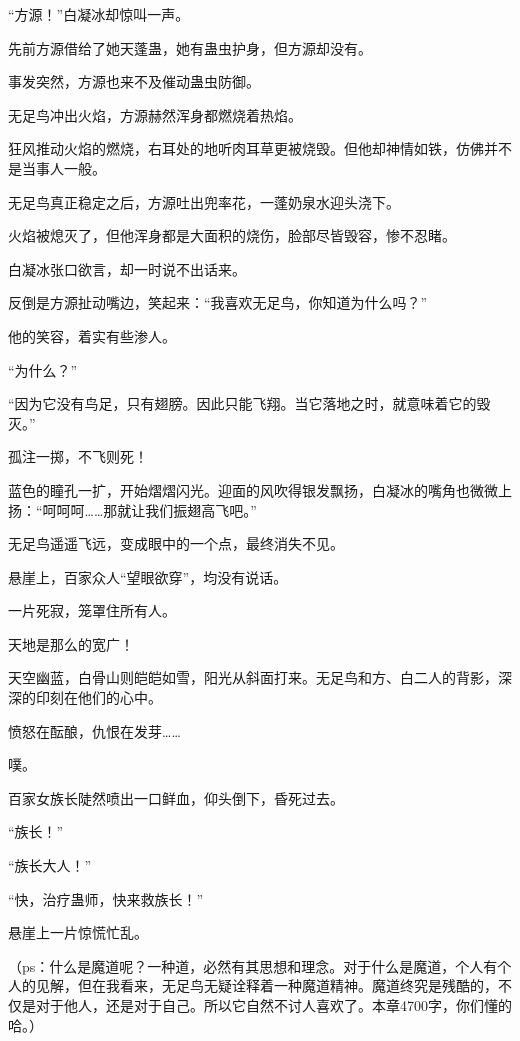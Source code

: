 \begin{this_body}
“方源！”白凝冰却惊叫一声。

先前方源借给了她天蓬蛊，她有蛊虫护身，但方源却没有。

事发突然，方源也来不及催动蛊虫防御。

无足鸟冲出火焰，方源赫然浑身都燃烧着热焰。

狂风推动火焰的燃烧，右耳处的地听肉耳草更被烧毁。但他却神情如铁，仿佛并不是当事人一般。

无足鸟真正稳定之后，方源吐出兜率花，一蓬奶泉水迎头浇下。

火焰被熄灭了，但他浑身都是大面积的烧伤，脸部尽皆毁容，惨不忍睹。

白凝冰张口欲言，却一时说不出话来。

反倒是方源扯动嘴边，笑起来：“我喜欢无足鸟，你知道为什么吗？”

他的笑容，着实有些渗人。

“为什么？”

“因为它没有鸟足，只有翅膀。因此只能飞翔。当它落地之时，就意味着它的毁灭。”

孤注一掷，不飞则死！

蓝色的瞳孔一扩，开始熠熠闪光。迎面的风吹得银发飘扬，白凝冰的嘴角也微微上扬：“呵呵呵……那就让我们振翅高飞吧。”

无足鸟遥遥飞远，变成眼中的一个点，最终消失不见。

悬崖上，百家众人“望眼欲穿”，均没有说话。

一片死寂，笼罩住所有人。

天地是那么的宽广！

天空幽蓝，白骨山则皑皑如雪，阳光从斜面打来。无足鸟和方、白二人的背影，深深的印刻在他们的心中。

愤怒在酝酿，仇恨在发芽……

噗。

百家女族长陡然喷出一口鲜血，仰头倒下，昏死过去。

“族长！”

“族长大人！”

“快，治疗蛊师，快来救族长！”

悬崖上一片惊慌忙乱。

（ps：什么是魔道呢？一种道，必然有其思想和理念。对于什么是魔道，个人有个人的见解，但在我看来，无足鸟无疑诠释着一种魔道精神。魔道终究是残酷的，不仅是对于他人，还是对于自己。所以它自然不讨人喜欢了。本章4700字，你们懂的哈。）

\end{this_body}

